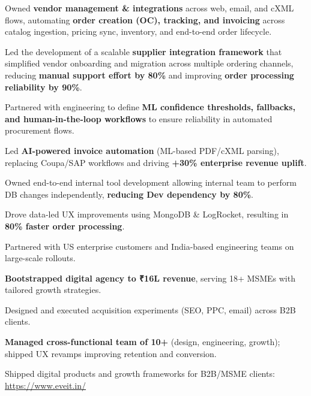 \documentclass[]{plushcv}
\begin{document}
\begin{minipage}[t]{0.70\textwidth}
\hspace{}
\begin{tightemize}
\item Owned \textbf{vendor management \& integrations} across web, email, and cXML flows, automating \textbf{order creation (OC), tracking, and invoicing} across catalog ingestion, pricing sync, inventory, and end-to-end order lifecycle.
\item Led the development of a scalable \textbf{supplier integration framework} that simplified vendor onboarding and migration across multiple ordering channels, reducing \textbf{manual support effort by 80\%} and improving \textbf{order processing reliability by 90\%}.
\item Partnered with engineering to define \textbf{ML confidence thresholds, fallbacks, and human-in-the-loop workflows} to ensure reliability in automated procurement flows.
\item Led \textbf{AI-powered invoice automation} (ML-based PDF/cXML parsing), replacing Coupa/SAP workflows and driving \textbf{+30\% enterprise revenue uplift}.
\item Owned end-to-end internal tool development allowing internal team to perform DB changes independently, \textbf{reducing Dev dependency by 80\%}.
\item Drove data-led UX improvements using MongoDB \& LogRocket, resulting in \textbf{80\% faster order processing}.
\item Partnered with US enterprise customers and India-based engineering teams on large-scale rollouts.
\end{tightemize}

\sectionsep


\begin{tightemize}
\item \textbf{Bootstrapped digital agency to ₹16L revenue}, serving 18+ MSMEs with tailored growth strategies.
\item Designed and executed acquisition experiments (SEO, PPC, email) across B2B clients.
\item \textbf{Managed cross-functional team of 10+} (design, engineering, growth); shipped UX revamps improving retention and conversion.
\item Shipped digital products and growth frameworks for B2B/MSME clients: \href{https://www.eveit.in/}{https://www.eveit.in/}
\end{tightemize}


\end{minipage}
\end{document}
